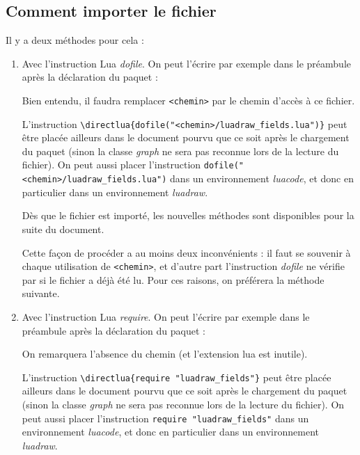 \documentclass[%
10pt,%
a4paper,%
french,%
]%
{article}%
\begin{document}
\subsection{Comment importer le fichier}

Il y a deux méthodes pour cela :

\begin{enumerate}
    \item Avec l'instruction Lua \emph{dofile}. On peut l'écrire par exemple dans le préambule après la déclaration du paquet :
    \begin{TeXcode}
    \usepackage[]{luadraw}
    \end{TeXcode}
    Bien entendu, il faudra remplacer \verb|<chemin>| par le chemin d'accès à ce fichier. 
    
    L'instruction \verb|\directlua{dofile("<chemin>/luadraw_fields.lua")}| peut être placée ailleurs dans le document pourvu que ce soit après le chargement du paquet (sinon la classe \emph{graph} ne sera pas reconnue lors de la lecture du fichier). On peut aussi placer l'instruction \verb|dofile("<chemin>/luadraw_fields.lua")| dans un environnement \emph{luacode}, et donc en particulier dans un environnement \emph{luadraw}.
    
    Dès que le fichier est importé, les nouvelles méthodes sont disponibles pour la suite du document.
    
    Cette façon de procéder a au moins deux inconvénients : il faut se souvenir à chaque utilisation de \verb|<chemin>|, et d'autre part l'instruction \emph{dofile} ne vérifie par si le fichier a déjà été lu. Pour ces raisons, on préférera la méthode suivante.
    
    \item Avec l'instruction Lua \emph{require}. On peut l'écrire par exemple dans le préambule après la déclaration du paquet :
    \begin{TeXcode}
    \usepackage[]{luadraw}
    \end{TeXcode}
    On remarquera l'absence du chemin (et l'extension lua est inutile).
    
    L'instruction \verb|\directlua{require "luadraw_fields"}| peut être placée ailleurs dans le document pourvu que ce soit après le chargement du paquet (sinon la classe \emph{graph} ne sera pas reconnue lors de la lecture du fichier). On peut aussi placer l'instruction \verb|require "luadraw_fields"| dans un environnement \emph{luacode}, et donc en particulier dans un environnement \emph{luadraw}.
    

\end{enumerate}
\end{document}

